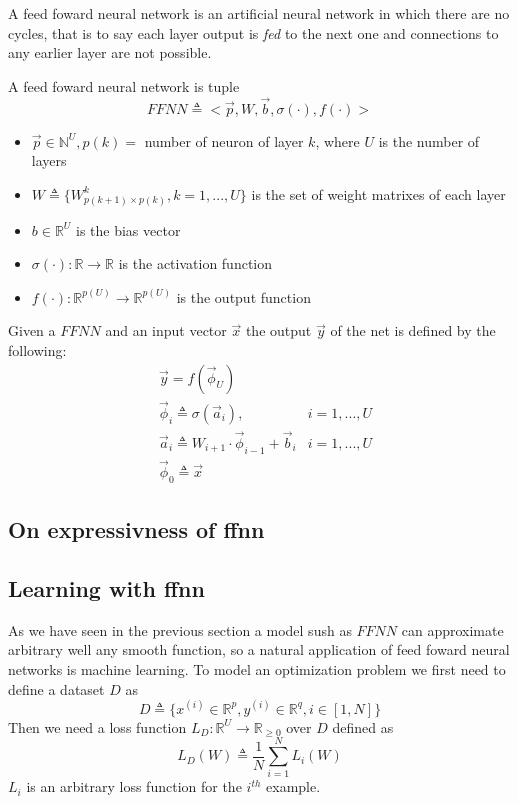 
A feed foward neural network is an artificial neural network in which there are no cycles, that is to say each layer output is \textit{fed} to the next one and connections to any earlier layer are not possible. 


\begin{defn}
\label{def_ffnn}
A feed foward neural network is tuple
$$FFNN\triangleq<\vec{p},W,\vec{b},\sigma(\cdot),f(\cdot)>$$
\begin{itemize}
 \item $\vec{p} \in \mathbb{N}^U, p(k)=$ number of neuron of layer $k$, where $U$ is the number of layers
 \item $W\triangleq \{W^k_{p(k+1) \times p(k)}, k=1,...,U \}$ is the set of weight matrixes of each layer
 \item $b \in \mathbb{R}^{U}$ is the bias vector
 \item $\sigma(\cdot): \mathbb{R}\rightarrow \mathbb{R}$ is the activation function
 \item $f(\cdot): \mathbb{R}^{p(U)}\rightarrow \mathbb{R}^{p(U)}$ is the output function
\end{itemize}
\end{defn}

Given a $FFNN$ and an input vector $\vec{x}$ the output $\vec{y}$ of the net is defined by the following:
\begin{align}
&\vec{y}=f(\vec{\phi}_{U}) &\\
&\vec{\phi}_{i} \triangleq \sigma(\vec{a}_{i}), & i=1,...,U\\
&\vec{a}_{i} \triangleq W_{i+1} \cdot \vec{\phi}_{i-1} +\vec{b}_i  & i=1,...,U\\
&\vec{\phi}_{0} \triangleq \vec{x} &
\end{align}


\subsection{On expressivness of ffnn}
\subsection{Learning with ffnn}

As we have seen in the previous section a model sush as $FFNN$ can approximate arbitrary well any smooth function, so a natural application of feed foward neural networks is machine learning.
To model an optimization problem we first need to define a dataset $D$ as 
\begin{equation}
D\triangleq\{x^{(i)} \in \mathbb{R}^p, y^{(i)} \in \mathbb{R}^q,  i\in[1,N]\}
\end{equation}
Then we need a loss function $L_D:\mathbb{R}^U \rightarrow \mathbb{R}_{\geq 0}$ over $D$ defined as
\begin{equation}
L_D(W)\triangleq\frac{1}{N}\sum_{i=1}^N L_i(W) 
\end{equation}
$L_i$ is an arbitrary loss function for the $i^{th}$ example.


